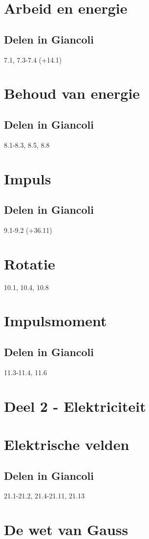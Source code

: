 \documentclass[12pt,a4paper]{article}
\begin{document}
	\section{Arbeid en energie}
	\subsection{Delen in Giancoli}
	7.1, 7.3-7.4 (+14.1)
	\section{Behoud van energie}
	\subsection{Delen in Giancoli}
	8.1-8.3, 8.5, 8.8
	\section{Impuls}
	\subsection{Delen in Giancoli}
	9.1-9.2 (+36.11)
	\section{Rotatie}
	10.1, 10.4, 10.8
	\section{Impulsmoment}
	\subsection{Delen in Giancoli}
	11.3-11.4, 11.6
	\newpage
	
	
	\section{Deel 2 - Elektriciteit}
	\section{Elektrische velden}
	\subsection{Delen in Giancoli}
	21.1-21.2, 21.4-21.11, 21.13 
	\section{De wet van Gauss}
\end{document}
